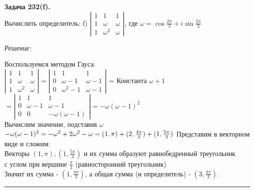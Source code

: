 \documentclass[a4paper, 12pt]{article}
\newenvironment{problem}[2][Задача]
    { \begin{mdframed}[backgroundcolor=gray!10] \textbf{#1 #2.} \\}
    {  \end{mdframed}}
\newenvironment{solution}
    {\textit{Решение: }}
    {\noindent\rule{7in}{1.5pt}}
\begin{document}
\begin{problem}{232(f)}
Вычислить определитель:
f) $\left| \begin{array}{rrr}1 & 1 & 1 \\ 1 & \omega & \omega\\1 & \omega^2 & \omega \end{array} \right|$,
где $\omega=\cos\frac{2\pi}{3}+i\sin\frac{2\pi}{3}$
\end{problem}
\begin{solution}

Воспользуемся методом Гауса: \\
$
\left|
\begin{array}{rrr}
  1 & 1 & 1 \\
  1 & \omega & \omega \\
  1 & \omega^2 & \omega
\end{array}
\right|
=
\left|
\begin{array}{rrr}
  1 & 1 & 1 \\
  0 & \omega - 1 & \omega - 1 \\
  0 & \omega^2 - 1 & \omega - 1
\end{array}
\right|
$
= Константа $\omega + 1$
$
=
\left|
\begin{array}{rrr}
  1 & 1 & 1 \\
  0 & \omega - 1 & \omega - 1 \\
  0 & 0 & -\omega(\omega - 1)
\end{array}
\right|
= -\omega(\omega - 1)^2
$ \\
Вычислим значение, подставив $\omega$ \\
$
-\omega(\omega - 1)^2 = -\omega^3 + 2\omega^2 - \omega = (1, \pi) + (2, \frac{4\pi}{3}) + (1, \frac{5\pi}{3}) \\
$
Представим в векторном виде и сложим: \\
Векторы $(1, \pi), (1, \frac{5\pi}{3})$ и их сумма образуют равнобедренный треугольник \\ с углом при вершине $\frac{\pi}{3}$ (равносторонний треугольник) \\
Значит их сумма - $(1, \frac{4\pi}{3})$, а общая сумма (и определитель) - $(3, \frac{4\pi}{3})$.

\end{solution}
\end{document}
